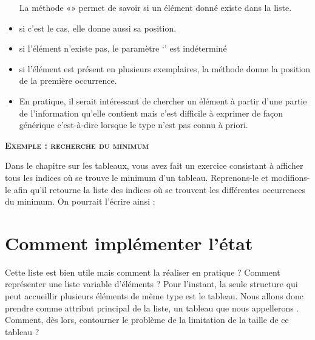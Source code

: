 \begin{itemize}
		La méthode «» permet de savoir si un élément
		donné existe dans la liste. 
	\item 
		si c’est le cas, elle donne aussi sa position.
	\item 
		si l’élément n’existe pas, le paramètre ‘’ est
		indéterminé 
	\item 
		si l’élément est présent en plusieurs exemplaires, la méthode donne la
		position de la première occurrence.
	\item 
		En pratique, il serait intéressant de chercher un élément à partir d’une
		partie de l’information qu’elle contient mais c’est difficile à
		exprimer de façon générique c'est-à-dire lorsque le
		type n'est pas connu à priori.
\end{itemize}

\bigskip

{\sffamily\bfseries\scshape
Exemple : recherche du minimum}

Dans le chapitre sur les tableaux, vous avez fait un exercice consistant
à afficher tous les indices où se trouve le minimum d’un tableau.
Reprenons-le et modifions-le afin qu’il retourne la liste des indices
où se trouvent les différentes occurrences du minimum. On pourrait
l’écrire ainsi :


\bigskip


\section{Comment implémenter l’état}

Cette liste est bien utile mais comment la réaliser en pratique ?
Comment représenter une liste variable d’éléments ? Pour
l'instant, la seule structure qui peut accueillir
plusieurs éléments de même type est le tableau. Nous allons donc
prendre comme attribut principal de la liste, un tableau que nous
appellerons . Comment, dès lors, contourner
le problème de la limitation de la taille de ce tableau ?


